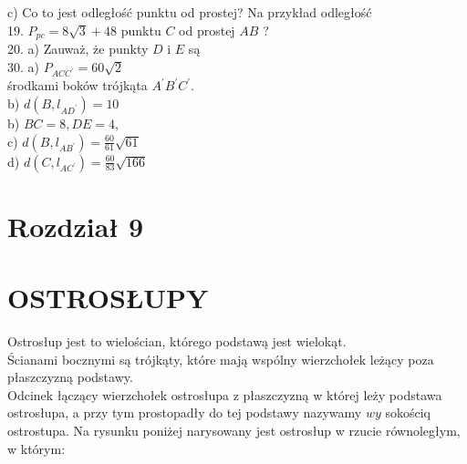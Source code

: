 \documentclass[10pt]{article}
\begin{document}
c) Co to jest odległość punktu od prostej? Na przykład odległość\\
19. \(P_{p c}=8 \sqrt{3}+48\) punktu \(C\) od prostej \(A B\) ?\\
20. a) Zauważ, że punkty \(D\) i \(E\) są\\
30. a) \(P_{A C C^{\prime}}=60 \sqrt{2}\)\\
środkami boków trójkąta \(A^{\prime} B^{\prime} C^{\prime}\).\\
b) \(d\left(B, l_{A D^{\prime}}\right)=10\)\\
b) \(B C=8, D E=4\),\\
c) \(d\left(B, l_{A B^{\prime}}\right)=\frac{60}{61} \sqrt{61}\)\\
d) \(d\left(C, l_{A C^{\prime}}\right)=\frac{60}{83} \sqrt{166}\)

\section*{Rozdział 9}
\section*{OSTROSŁUPY}
Ostrosłup jest to wielościan, którego podstawą jest wielokąt.\\
Ścianami bocznymi są trójkąty, które mają wspólny wierzchołek leżący poza płaszczyzną podstawy.\\
Odcinek łączący wierzchołek ostrosłupa z płaszczyzną w której leży podstawa ostrosłupa, a przy tym prostopadły do tej podstawy nazywamy \(w y\) sokościq ostrostupa. Na rysunku poniżej narysowany jest ostrosłup w rzucie równoległym, w którym:
\end{document}
